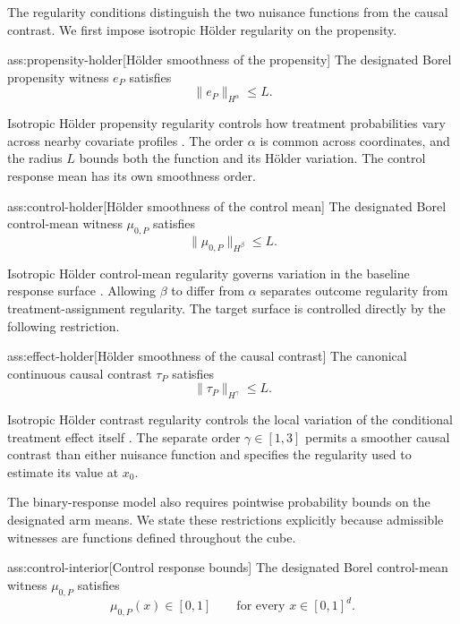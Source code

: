 \documentclass[11pt]{article}
\begin{document}
The regularity conditions distinguish the two nuisance functions from the causal contrast. We first impose isotropic Hölder regularity on the propensity.

\begin{assumptionv}{ass:propensity-holder}[Hölder smoothness of the propensity]
The designated Borel propensity witness \(e_P\) satisfies
\[
\|e_P\|_{H^\alpha}\le L.
\]
\end{assumptionv}

Isotropic Hölder propensity regularity controls how treatment probabilities vary across nearby covariate profiles \citep{KennedyBalakrishnanRobinsWasserman2024}. The order \(\alpha\) is common across coordinates, and the radius \(L\) bounds both the function and its Hölder variation. The control response mean has its own smoothness order.

\begin{assumptionv}{ass:control-holder}[Hölder smoothness of the control mean]
The designated Borel control-mean witness \(\mu_{0,P}\) satisfies
\[
\|\mu_{0,P}\|_{H^\beta}\le L.
\]
\end{assumptionv}

Isotropic Hölder control-mean regularity governs variation in the baseline response surface \citep{KennedyBalakrishnanRobinsWasserman2024}. Allowing \(\beta\) to differ from \(\alpha\) separates outcome regularity from treatment-assignment regularity. The target surface is controlled directly by the following restriction.

\begin{assumptionv}{ass:effect-holder}[Hölder smoothness of the causal contrast]
The canonical continuous causal contrast \(\tau_P\) satisfies
\[
\|\tau_P\|_{H^\gamma}\le L.
\]
\end{assumptionv}

Isotropic Hölder contrast regularity controls the local variation of the conditional treatment effect itself \citep{KennedyBalakrishnanRobinsWasserman2024}. The separate order \(\gamma\in[1,3]\) permits a smoother causal contrast than either nuisance function and specifies the regularity used to estimate its value at \(x_0\).

The binary-response model also requires pointwise probability bounds on the designated arm means. We state these restrictions explicitly because admissible witnesses are functions defined throughout the cube.

\begin{assumptionv}{ass:control-interior}[Control response bounds]
The designated Borel control-mean witness \(\mu_{0,P}\) satisfies
\[
\mu_{0,P}(x)\in[0,1]
\qquad\text{for every }x\in[0,1]^d.
\]
\end{assumptionv}
\end{document}
